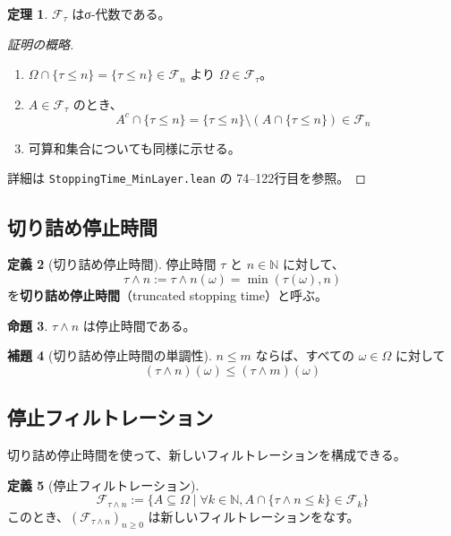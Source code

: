 \documentclass[a4paper,12pt]{ltjsarticle}
\theoremstyle{definition}
\newtheorem{definition}{定義}[section]
\newtheorem{theorem}[definition]{定理}
\newtheorem{lemma}[definition]{補題}
\newtheorem{proposition}[definition]{命題}
\begin{document}
\begin{theorem}
$\mathcal{F}_\tau$ はσ-代数である。
\end{theorem}

\begin{proof}[証明の概略]
\begin{enumerate}
  \item $\Omega \cap \{\tau \leq n\} = \{\tau \leq n\} \in \mathcal{F}_n$ より $\Omega \in \mathcal{F}_\tau$。
  \item $A \in \mathcal{F}_\tau$ のとき、
        \[
          A^c \cap \{\tau \leq n\} = \{\tau \leq n\} \setminus (A \cap \{\tau \leq n\}) \in \mathcal{F}_n
        \]
  \item 可算和集合についても同様に示せる。
\end{enumerate}
詳細は \texttt{StoppingTime\_MinLayer.lean} の 74--122行目を参照。
\end{proof}

\subsection{切り詰め停止時間}

\begin{definition}[切り詰め停止時間]
停止時間 $\tau$ と $n \in \mathbb{N}$ に対して、
\[
  \tau \wedge n := \tau \wedge n(\omega) = \min(\tau(\omega), n)
\]
を\textbf{切り詰め停止時間}（truncated stopping time）と呼ぶ。
\end{definition}

\begin{proposition}
$\tau \wedge n$ は停止時間である。
\end{proposition}

\begin{lemma}[切り詰め停止時間の単調性]
$n \leq m$ ならば、すべての $\omega \in \Omega$ に対して
\[
  (\tau \wedge n)(\omega) \leq (\tau \wedge m)(\omega)
\]
\end{lemma}

\subsection{停止フィルトレーション}

切り詰め停止時間を使って、新しいフィルトレーションを構成できる。

\begin{definition}[停止フィルトレーション]
\[
  \mathcal{F}_{\tau \wedge n} := \{A \subseteq \Omega \mid
    \forall k \in \mathbb{N}, A \cap \{\tau \wedge n \leq k\} \in \mathcal{F}_k\}
\]
このとき、$(\mathcal{F}_{\tau \wedge n})_{n \geq 0}$ は新しいフィルトレーションをなす。
\end{definition}
\end{document}
